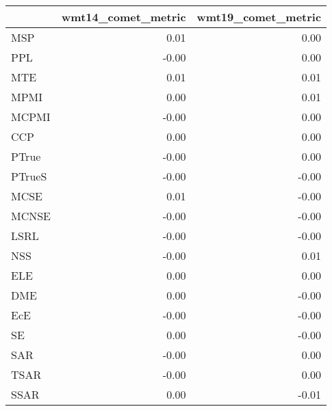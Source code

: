 \begin{tabular}{lrr}
\toprule
 & wmt14\_comet\_metric & wmt19\_comet\_metric \\
\midrule
MSP & 0.01 & 0.00 \\
PPL & -0.00 & 0.00 \\
MTE & 0.01 & 0.01 \\
MPMI & 0.00 & 0.01 \\
MCPMI & -0.00 & 0.00 \\
CCP & 0.00 & 0.00 \\
PTrue & -0.00 & 0.00 \\
PTrueS & -0.00 & -0.00 \\
MCSE & 0.01 & -0.00 \\
MCNSE & -0.00 & -0.00 \\
LSRL & -0.00 & -0.00 \\
NSS & -0.00 & 0.01 \\
ELE & 0.00 & 0.00 \\
DME & 0.00 & -0.00 \\
EcE & -0.00 & -0.00 \\
SE & 0.00 & -0.00 \\
SAR & -0.00 & 0.00 \\
TSAR & -0.00 & 0.00 \\
SSAR & 0.00 & -0.01 \\
\bottomrule
\end{tabular}
